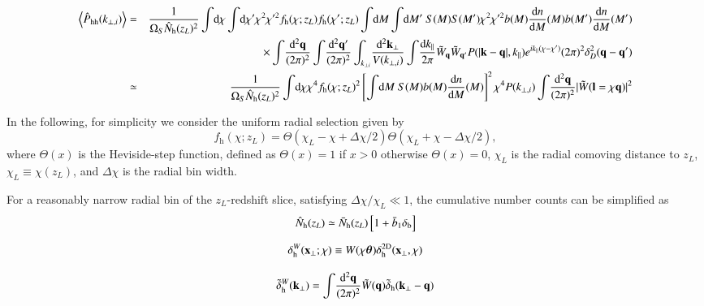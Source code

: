 \documentclass[onecolumn,notitlepage,showpacs,amsmath,amssymb,prd,floatfix]{revtex4-1}
\def\ave#1{\left\langle #1 \right\rangle}
\newcommand{\bx}{{\bf x}}
\newcommand{\bk}{{\bf k}}
\newcommand{\btheta}{{\bm{\theta}}}
\newcommand{\bq}{{\bf q}}
\newcommand{\bl}{{\bf l}}
\newcommand{\tdelta}{\tilde{\delta}}
\newcommand{\tW}{\tilde{W}}
\newcommand{\dr}{\mathrm{d}}
\newcommand{\hphh}{\hat{P}_{\mathrm{hh}}}
\newcommand{\bh}{\mathrm{h}}
\newcommand{\bnh}{\frac{\dr n}{\dr M}}
\newcommand{\br}{{\rm b}}
\begin{document}
\begin{eqnarray}
 \ave{ \hphh(k_{\perp, i})}&=&
  \frac{1}{\Omega_S\hat{N}_\bh(z_L)^2}
  \int\!\dr\chi\int\!\dr\chi' \chi^2\chi^{\prime 2}f_\bh(\chi;z_L)f_\bh(\chi';z_L)
  \int\!\dr M\int\!\dr M'~S(M)S(M')\chi^2\chi^{\prime
  2}b(M)\bnh(M) b(M')
  \bnh(M')
\nonumber\\
&&\times  
  \int\!\frac{\dr^2\bq}{(2\pi)^2}
  \int\!\frac{\dr^2\bq'}{(2\pi)^2}
    \int_{k_{\perp
 i}}\!\frac{\dr^2\bk_\perp}{V(k_{\perp, i})}
\int\!\frac{\dr k_\parallel}{2\pi}
    \tW_{\bq}\tW_{\bq'}
    P(|\bk-\bq|,k_\parallel)e^{ik_\parallel(\chi-\chi')}(2\pi)^2\delta_D^2(\bq-\bq')\nonumber\\
 &\simeq &
      \frac{1}{\Omega_S\hat{N}_\bh(z_L)^2}
  \int\!\dr\chi \chi^4f_\bh(\chi;z_L)^2
  \left[\int\!\dr M~S(M)b(M)\bnh(M)\right]^2\chi^4P(k_{\perp,
  i})\int\!\frac{\dr^2\bq}{(2\pi)^2}|\tW(\bl=\chi\bq)|^2
\end{eqnarray}


In the following, for simplicity we consider the uniform radial
selection given by
%
\begin{equation}
 f_\bh(\chi;z_L)=\Theta(\chi_L-\chi+\Delta\chi/2)\Theta(\chi_L+\chi-\Delta\chi/2),
\end{equation}
%
where $\Theta(x)$ is the Heviside-step function, defined as
$\Theta(x)=1$ if $x>0$ otherwise $\Theta(x)=0$, $\chi_L$ is the radial
comoving distance to $z_L$, $\chi_L\equiv \chi(z_L)$, and $\Delta\chi$
is the radial bin width.


For a reasonably narrow radial bin of the $z_L$-redshift slice,
satisfying $\Delta\chi/\chi_L\ll 1$, the cumulative number counts can be
simplified as
%
\begin{equation}
 \hat{N}_\bh(z_L)\simeq \bar{N}_{\bh}(z_L)\left[1+\bar{b}_1\delta_\br\right]
\end{equation}

\begin{equation}
 \delta^W_{\bh}(\bx_\perp;\chi)\equiv W(\chi\btheta)\delta^{\rm 2D}_{\bh}(\bx_\perp,\chi)
\end{equation}

\begin{equation}
\tdelta^W_{\bh}(\bk_\perp)=\int\!\frac{\dr^2\bq}{(2\pi)^2}\tW(\bq)\tdelta_{\bh}(\bk_\perp-\bq)
\end{equation}
\end{document}
